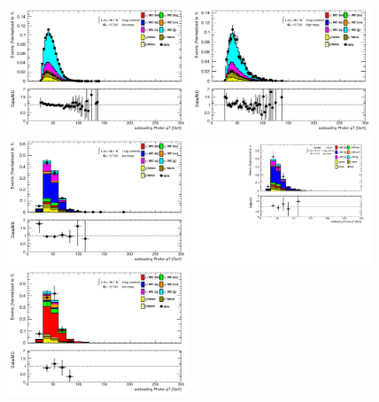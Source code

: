 \begin{figure}[htbp]
  \centering
  \includegraphics[width=0.48\textwidth]{chapters/chapter5_yybb/images/data_MC_comparison/h_CR_l_0t_nominal_subleadingPhoton_pt.pdf}
  \includegraphics[width=0.48\textwidth]{chapters/chapter5_yybb/images/data_MC_comparison/h_CR_h_0t_nominal_subleadingPhoton_pt.pdf}
  \includegraphics[width=0.48\textwidth]{chapters/chapter5_yybb/images/data_MC_comparison/h_SR_l_1t_nominal_subleadingPhoton_pt.pdf}
  \includegraphics[width=0.48\textwidth]{chapters/chapter5_yybb/images/data_MC_comparison/h_SR_h_1t_nominal_subleadingPhoton_pt.pdf}
  \includegraphics[width=0.48\textwidth]{chapters/chapter5_yybb/images/data_MC_comparison/h_SR_l_2t_nominal_subleadingPhoton_pt.pdf}

\end{figure}
